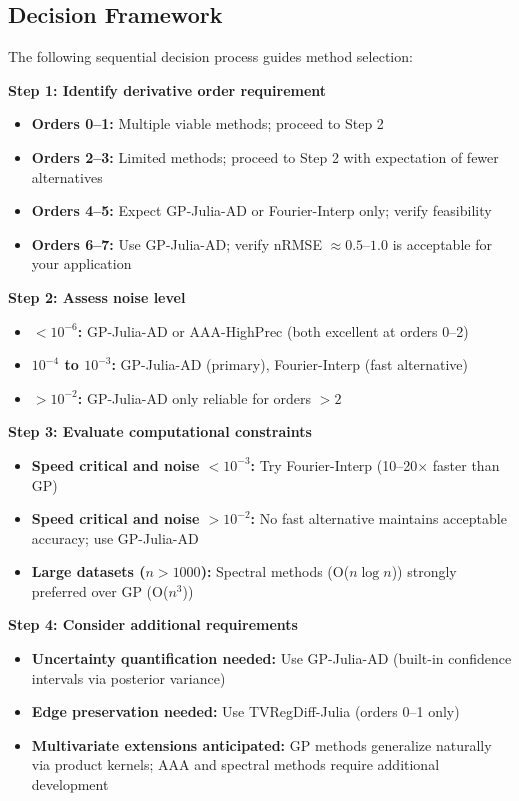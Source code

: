 \subsection{Decision Framework}
\label{sec:decision_framework}

The following sequential decision process guides method selection:

\textbf{Step 1: Identify derivative order requirement}
\begin{itemize}
    \item \textbf{Orders 0--1:} Multiple viable methods; proceed to Step 2
    \item \textbf{Orders 2--3:} Limited methods; proceed to Step 2 with expectation of fewer alternatives
    \item \textbf{Orders 4--5:} Expect GP-Julia-AD or Fourier-Interp only; verify feasibility
    \item \textbf{Orders 6--7:} Use GP-Julia-AD; verify nRMSE $\approx 0.5$--$1.0$ is acceptable for your application
\end{itemize}

\textbf{Step 2: Assess noise level}
\begin{itemize}
    \item \textbf{$< 10^{-6}$:} GP-Julia-AD or AAA-HighPrec (both excellent at orders 0--2)
    \item \textbf{$10^{-4}$ to $10^{-3}$:} GP-Julia-AD (primary), Fourier-Interp (fast alternative)
    \item \textbf{$> 10^{-2}$:} GP-Julia-AD only reliable for orders $> 2$
\end{itemize}

\textbf{Step 3: Evaluate computational constraints}
\begin{itemize}
    \item \textbf{Speed critical and noise $< 10^{-3}$:} Try Fourier-Interp (10--20$\times$ faster than GP)
    \item \textbf{Speed critical and noise $> 10^{-2}$:} No fast alternative maintains acceptable accuracy; use GP-Julia-AD
    \item \textbf{Large datasets ($n > 1000$):} Spectral methods (O($n \log n$)) strongly preferred over GP (O($n^3$))
\end{itemize}

\textbf{Step 4: Consider additional requirements}
\begin{itemize}
    \item \textbf{Uncertainty quantification needed:} Use GP-Julia-AD (built-in confidence intervals via posterior variance)
    \item \textbf{Edge preservation needed:} Use TVRegDiff-Julia (orders 0--1 only)
    \item \textbf{Multivariate extensions anticipated:} GP methods generalize naturally via product kernels; AAA and spectral methods require additional development
\end{itemize}

